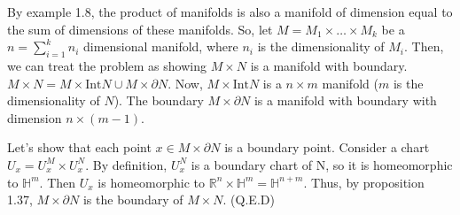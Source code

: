 \documentclass[a4paper]{article}
\begin{document}
\begin{exercise}[1-12]
    By example 1.8, the product of manifolds is also a manifold of dimension
    equal to the sum of dimensions of these manifolds. So, let $M = M_1 \times \dots \times M_k$
    be a $n = \sum_{i=1}^k n_i$ dimensional manifold, where $n_i$ is the dimensionality
    of $M_i$. Then, we can treat the problem as showing $M \times N$ is a manifold with
    boundary. $M \times N = M\times \text{Int}N \cup M\times \partial N$. Now,
    $M \times \text{Int}N$ is a $n\times m$ manifold ($m$ is the dimensionality of $N$).
    The boundary $M \times \partial N$ is a manifold with boundary with dimension
    $n \times (m-1)$.

    Let's show that each point $x \in M\times \partial N$ is a boundary point.
    Consider a chart $U_x = U^M_x \times U^N_x$. By definition, $U^N_x$ is a
    boundary chart of N, so it is homeomorphic to $\mathbb{H}^m$. Then $U_x$ is
    homeomorphic to $\mathbb{R}^n \times \mathbb{H}^m = \mathbb{H}^{n+m}$. Thus,
    by proposition 1.37, $M \times \partial N$ is the boundary of $M \times N$. (Q.E.D)
\end{exercise}
\end{document}
